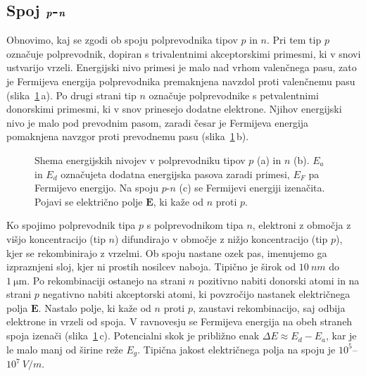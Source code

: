 \subsection*{Spoj $\textbf{\textit{p}}$-$\textbf{\textit{n}}$}
Obnovimo, kaj se zgodi ob spoju polprevodnika tipov $p$ in $n$. Pri tem tip $p$ označuje
polprevodnik, dopiran s trivalentnimi akceptorskimi primesmi, ki v snovi ustvarijo vrzeli.
Energijski nivo primesi je malo nad vrhom valenčnega pasu, zato je Fermijeva energija
polprevodnika premaknjena navzdol proti valenčnemu pasu (slika~\ref{11_PN1}\,a). 
Po drugi strani tip $n$ označuje polprevodnike s petvalentnimi 
donorskimi primesmi, ki v snov prinesejo dodatne elektrone. Njihov energijski nivo je malo 
pod prevodnim pasom, zaradi česar je Fermijeva energija pomaknjena navzgor proti prevodnemu pasu
(slika~\ref{11_PN1}\,b).
\begin{figure}[ht]
\centering
\def\svgwidth{140truemm} 

\caption{Shema energijskih nivojev v polprevodniku tipov $p$ (a) in $n$ (b). 
$E_a$ in $E_d$ označujeta dodatna energijska pasova zaradi primesi, 
$E_F$ pa Fermijevo energijo. Na spoju $p$-$n$ (c) se Fermijevi energiji izenačita.
Pojavi se električno polje $\mathbf{E}$, ki kaže od $n$ proti $p$.}
\label{11_PN1}
\end{figure}

Ko spojimo polprevodnik tipa $p$ s polprevodnikom tipa $n$, elektroni 
z območja z višjo koncentracijo (tip $n$) difundirajo v območje z nižjo koncentracijo
(tip $p$), kjer se rekombinirajo z vrzelmi. 
Ob spoju nastane ozek pas, imenujemo ga izpraznjeni sloj, kjer ni  
prostih nosilcev naboja. Tipično je širok od $10~\si{nm}$ do $1~\si{\micro\metre}$.
Po rekombinaciji ostanejo na strani $n$ pozitivno nabiti donorski atomi in 
na strani $p$ negativno nabiti akceptorski atomi, ki povzročijo nastanek  
električnega polja $\mathbf{E}$. Nastalo polje, ki kaže od $n$ proti $p$, zaustavi rekombinacijo, saj odbija
elektrone in vrzeli od spoja. V ravnovesju se Fermijeva energija na obeh straneh spoja 
izenači (slika~\ref{11_PN1}\,c). 
Potencialni skok je približno enak $\Delta E \approx E_d-E_a$, kar je le malo manj od 
širine reže $E_g$. Tipična jakost električnega polja na spoju je $10^5$--$10^7~\si{V/m}$.

